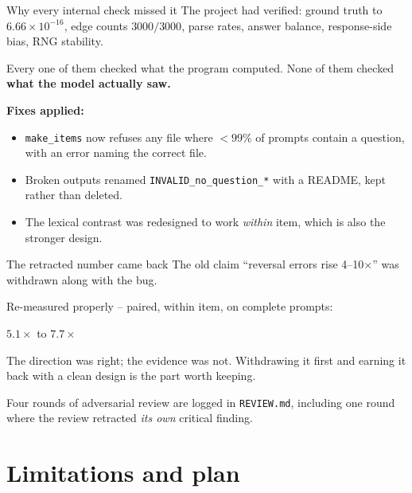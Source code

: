 \documentclass{beamer}
\begin{document}
\begin{frame}{Why every internal check missed it}
  The project had verified: ground truth to $6.66\times10^{-16}$, edge counts
  $3000/3000$, parse rates, answer balance, response-side bias, RNG stability.

  \vspace{0.3cm}
  \begin{block}{Every one of them checked what the program computed.}
    None of them checked \textbf{what the model actually saw.}
  \end{block}

  \vspace{0.3cm}
  \textbf{Fixes applied:}
  \begin{itemize}
    \item \texttt{make\_items} now refuses any file where $<99\%$ of prompts
      contain a question, with an error naming the correct file.
    \item Broken outputs renamed \texttt{INVALID\_no\_question\_*} with a README,
      kept rather than deleted.
    \item The lexical contrast was redesigned to work \emph{within} item, which
      is also the stronger design.
  \end{itemize}
\end{frame}

\begin{frame}{The retracted number came back}
  The old claim ``reversal errors rise 4--10$\times$'' was withdrawn along with
  the bug.

  \vspace{0.3cm}
  Re-measured properly -- paired, within item, on complete prompts:

  \begin{center}
    \Large $\mathbf{5.1\times}$ to $\mathbf{7.7\times}$
  \end{center}

  \vspace{0.3cm}
  The direction was right; the evidence was not. Withdrawing it first and
  earning it back with a clean design is the part worth keeping.

  \vspace{0.3cm}
  Four rounds of adversarial review are logged in \texttt{REVIEW.md}, including
  one round where the review retracted \emph{its own} critical finding.
\end{frame}

\section{Limitations and plan}
\begin{frame}
  \sectionpage
\end{frame}
\end{document}
